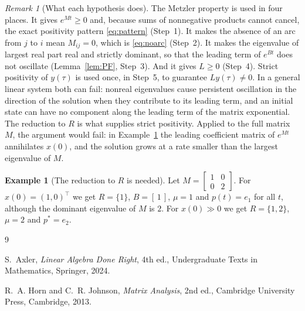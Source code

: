 \documentclass[11pt]{article}
\theoremstyle{definition}
\newtheorem{example}[theorem]{Example}
\theoremstyle{remark}
\newtheorem{remark}[theorem]{Remark}
\newcommand{\T}{\top}
\begin{document}
\begin{remark}[What each hypothesis does]\label{rem:roles}
The Metzler property is used in four places. It gives $e^{Mt} \ge 0$ and, because sums of
nonnegative products cannot cancel, the exact positivity pattern \eqref{eq:pattern} (Step~1). It
makes the absence of an arc from $j$ to $i$ mean $M_{ij} = 0$, which is \eqref{eq:noarc} (Step~2).
It makes the eigenvalue of largest real part real and strictly dominant, so that the leading term
of $e^{Bt}$ does not oscillate (Lemma~\ref{lem:PF}, Step~3). And it gives $L \ge 0$ (Step~4). Strict positivity of
$y(\tau)$ is used once, in Step~5, to guarantee $L y(\tau) \ne 0$. In a general linear system both
can fail: nonreal eigenvalues cause persistent oscillation in the direction of the solution when
they contribute to its leading term, and an initial state can have no component along the leading
term of the matrix exponential. The reduction to $R$ is what supplies strict positivity. Applied
to the full matrix $M$, the argument would fail: in Example~\ref{ex:reduction} the leading
coefficient matrix of $e^{Mt}$ annihilates $x(0)$, and the solution grows at a rate smaller than
the largest eigenvalue of $M$.
\end{remark}

\begin{example}[The reduction to $R$ is needed]\label{ex:reduction}
Let $M = \begin{bmatrix} 1 & 0 \\ 0 & 2 \end{bmatrix}$. For $x(0) = (1, 0)^\T$ we get $R = \{1\}$,
$B = [\,1\,]$, $\mu = 1$ and $p(t) = e_1$ for all $t$, although the dominant eigenvalue of $M$ is
$2$. For $x(0) \gg 0$ we get $R = \{1,2\}$, $\mu = 2$ and $p^* = e_2$.
\end{example}


\begin{thebibliography}{9}

S.~Axler,
\emph{Linear Algebra Done Right}, 4th ed.,
Undergraduate Texts in Mathematics, Springer, 2024.

R.~A. Horn and C.~R. Johnson,
\emph{Matrix Analysis}, 2nd ed.,
Cambridge University Press, Cambridge, 2013.

\end{thebibliography}
\end{document}
